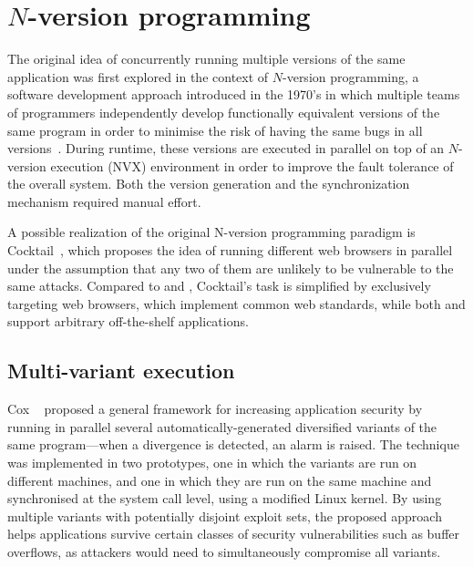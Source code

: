 \section{$N$-version programming}
\label{related:nvp}

The original idea of concurrently running multiple versions of the same
application was first explored in the context of $N$-version programming, a
software development approach introduced in the 1970's in which multiple teams
of programmers independently develop functionally equivalent versions of the
same program in order to minimise the risk of having the same bugs in all
versions~\cite{chen1995}. During runtime, these versions are executed in
parallel on top of an $N$-version execution (NVX) environment in order to
improve the fault tolerance of the overall system. Both the version generation
and the synchronization mechanism required manual effort.

A possible realization of the original N-version programming paradigm is
Cocktail~\cite{cocktail}, which proposes the idea of running different web
browsers in parallel under the assumption that any two of them are unlikely to
be vulnerable to the same attacks. Compared to \mx and \varan, Cocktail's task
is simplified by exclusively targeting web browsers, which implement common web
standards, while both \mx and \varan support arbitrary off-the-shelf
applications.



\subsection{Multi-variant execution}

Cox \etal~\cite{cox2006} proposed a general framework for increasing
application security by running in parallel several automatically-generated
diversified variants of the same program---when a divergence is detected, an
alarm is raised. The technique was implemented in two prototypes, one in which
the variants are run on different machines, and one in which they are run on
the same machine and synchronised at the system call level, using a modified
Linux kernel. By using multiple variants with potentially disjoint exploit
sets, the proposed approach helps applications survive certain classes of
security vulnerabilities such as buffer overflows, as attackers would need to
simultaneously compromise all variants.

